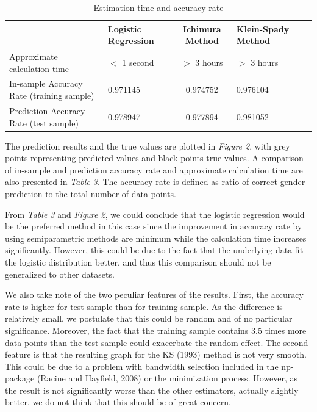 \documentclass[a4paper]{article}
\begin{document}
\begin{table}
    \centering
	\begin{center}
	\begin{tabular}{  m{2cm} | m{3cm} c m{3cm} c m{3cm} |}
	  & Logistic Regression & Ichimura Method & Klein-Spady Method
	\tabularnewline
	\midrule
	Approximate calculation time & $<$ 1 second & $>$ 3 hours & $>$ 3 hours
	\tabularnewline
	\midrule
	In-sample Accuracy Rate (training sample) & 0.971145 & 0.974752 & 0.976104
	\tabularnewline
	\midrule
	Prediction Accuracy Rate (test sample) & 0.978947 &  0.977894 & 0.981052 
	\tabularnewline
	\bottomrule
	\end{tabular}
	\end{center}
	\caption {Estimation time and accuracy rate}
\end{table}

The prediction results and the true values are plotted in \textit{Figure 2}, with grey points representing predicted values and black points true values. A comparison of in-sample and prediction accuracy rate and approximate calculation time are also presented in \textit{Table 3}. The accuracy rate is defined as ratio of correct gender prediction to the total number of data points.


From \textit{Table 3} and \textit{Figure 2}, we could conclude that the logistic regression would be the preferred method in this case since the improvement in accuracy rate by using semiparametric methods are minimum while the calculation time increases significantly. However, this could be due to the fact that the underlying data fit the logistic distribution better, and thus this comparison should not be generalized to other datasets. 

We also take note of the two peculiar features of the results. First, the accuracy rate is higher for test sample than for training sample. As the difference is relatively small, we postulate that this could be random and of no particular significance. Moreover, the fact that the training sample contains 3.5 times more data points than the test sample could exacerbate the random effect. The second feature is that the resulting graph for the KS (1993) \cite{[12]} method is not very smooth. This could be due to a problem with bandwidth selection included in the np-package (Racine and Hayfield, 2008) \cite{[28]} or the minimization process. However, as the result is not significantly worse than the other estimators, actually slightly better, we do not think that this should be of great concern.
\end{document}
